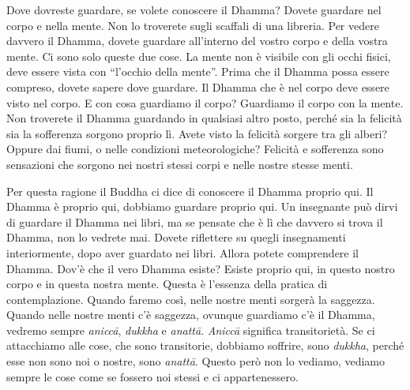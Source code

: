 Dove dovreste guardare, se volete conoscere il Dhamma? Dovete guardare
nel corpo e nella mente. Non lo troverete sugli scaffali di una
libreria. Per vedere davvero il Dhamma, dovete guardare all'interno del
vostro corpo e della vostra mente. Ci sono solo queste due cose. La
mente non è visibile con gli occhi fisici, deve essere vista con
``l'occhio della mente''. Prima che il Dhamma possa essere compreso,
dovete sapere dove guardare. Il Dhamma che è nel corpo deve essere visto
nel corpo. E con cosa guardiamo il corpo? Guardiamo il corpo con la
mente. Non troverete il Dhamma guardando in qualsiasi altro posto,
perché sia la felicità sia la sofferenza sorgono proprio lì. Avete visto
la felicità sorgere tra gli alberi? Oppure dai fiumi, o nelle condizioni
meteorologiche? Felicità e sofferenza sono sensazioni che sorgono nei
nostri stessi corpi e nelle nostre stesse menti.

Per questa ragione il Buddha ci dice di conoscere il Dhamma proprio qui.
Il Dhamma è proprio qui, dobbiamo guardare proprio qui. Un insegnante
può dirvi di guardare il Dhamma nei libri, ma se pensate che è lì che
davvero si trova il Dhamma, non lo vedrete mai. Dovete riflettere su
quegli insegnamenti interiormente, dopo aver guardato nei libri. Allora
potete comprendere il Dhamma. Dov'è che il vero Dhamma esiste? Esiste
proprio qui, in questo nostro corpo e in questa nostra mente. Questa è
l'essenza della pratica di contemplazione. Quando faremo così, nelle
nostre menti sorgerà la saggezza. Quando nelle nostre menti c'è
saggezza, ovunque guardiamo c'è il Dhamma, vedremo sempre \emph{aniccā},
\emph{dukkha} e \emph{anattā}. \emph{Aniccā} significa transitorietà. Se
ci attacchiamo alle cose, che sono transitorie, dobbiamo soffrire, sono
\emph{dukkha}, perché esse non sono noi o nostre, sono \emph{anattā}.
Questo però non lo vediamo, vediamo sempre le cose come se fossero noi
stessi e ci appartenessero.

